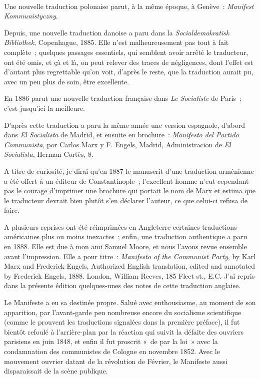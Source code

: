 \documentclass[french,twoside]{book} %
\begin{document}
\noindent  \par
Une nouvelle traduction polonaise parut, à la même époque, à Genève : \emph{Manifest Kommunistyczny}.\par
Depuis, une nouvelle traduction danoise a paru dans la \emph{Socialdemokratisk Bibliothek}, Copenhague, 1885. Elle n’est malheureusement pas tout à fait complète ; quelques passages essentiels, qui semblent avoir arrêté le traducteur, ont été omis, et çà et là, on peut relever des traces de négligences, dont l’effet est d’autant plus regrettable qu’on voit, d’après le reste, que la traduction aurait pu, avec un peu plus de soin, être excellente.\par
En 1886 parut une nouvelle traduction française dans \emph{Le Socialiste} de Paris ; c’est jusqu’ici la meilleure.\par
D'après cette traduction a paru la même année une version espagnole, d’abord dans \emph{El Socialista} de Madrid, et ensuite en brochure : \emph{Manifesto del Partido Communista}, por Carlos Marx y F. Engels, Madrid, Administracion de \emph{El Socialista}, Herman Cortès, 8.\par
A titre de curiosité, je dirai qu’en 1887 le manuscrit d’une traduction arménienne a été offert à un éditeur de Constantinople ; l’excellent homme n’eut cependant pas le courage d’imprimer une brochure qui portait le nom de Marx et estima que le traducteur devrait bien plutôt s’en déclarer l’auteur, ce que celui-ci refusa de faire.\par
A plusieurs reprises ont été réimprimées en Angleterre certaines traductions américaines plus ou moins inexactes ; enfin, une traduction authentique a paru en 1888. Elle est due à mon ami Samuel Moore, et nous l’avons revue ensemble avant l’impression. Elle a pour titre : \emph{Manifesto of the Communist Party}, by Karl Marx and Frederick Engels, Authorized English translation, edited and annotated by Frederick Engels, 1888. London, William Reeves, 185 Fleet st., E.C. J'ai repris dans la présente édition quelques-unes des notes de cette traduction anglaise.\par
Le Manifeste a eu sa destinée propre. Salué avec enthousiasme, au moment de son apparition, par l’avant-garde peu nombreuse encore du socialisme scientifique (comme le prouvent les traductions signalées dans la première préface), il fut bientôt refoulé à l’arrière-plan par la réaction qui suivit la défaite des ouvriers parisiens en juin 1848, et enfin il fut proscrit « de par la loi » avec la condamnation des communistes de Cologne en novembre 1852. Avec le mouvement ouvrier datant de la révolution de Février, le Manifeste aussi disparaissait de la scène publique.\par
\end{document}
